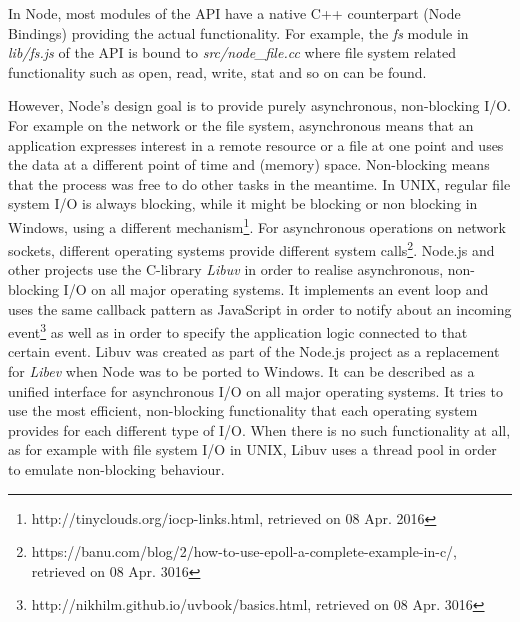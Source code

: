 In Node, most modules of the API have a native C++ counterpart (Node Bindings) providing the actual functionality. For example, the \textit{fs} module in \textit{lib/fs.js} of the API is bound to \textit{src/node\_file.cc} where file system related functionality such as open, read, write, stat and so on can be found. 

However, Node's design goal is to provide purely asynchronous, non-blocking I/O. For example on the network or the file system, asynchronous means that an application expresses interest in a remote resource or a file at one point and uses the data at a different point of time and (memory) space. Non-blocking means that the process was free to do other tasks in the meantime. In UNIX, regular file system I/O is always blocking, while it might be blocking or non blocking in Windows, using a different mechanism\footnote{http://tinyclouds.org/iocp-links.html, retrieved on 08 Apr. 2016}. For asynchronous operations on network sockets, different operating systems provide different system calls\footnote{https://banu.com/blog/2/how-to-use-epoll-a-complete-example-in-c/, retrieved on 08 Apr. 3016}. Node.js and other projects use the C-library \textit{Libuv} in order to realise asynchronous, non-blocking I/O on all major operating systems. It implements an event loop and uses the same callback pattern as JavaScript in order to notify about an incoming event\footnote{http://nikhilm.github.io/uvbook/basics.html, retrieved on 08 Apr. 3016} as well as in order to specify the application logic connected to that certain event. Libuv was created as part of the Node.js project as a replacement for \textit{Libev} when Node was to be ported to Windows. It can be described as a unified interface for asynchronous I/O on all major operating systems. It tries to use the most efficient, non-blocking functionality that each operating system provides for each different type of I/O. When there is no such functionality at all, as for example with file system I/O in UNIX, Libuv uses a thread pool in order to emulate non-blocking behaviour. 

